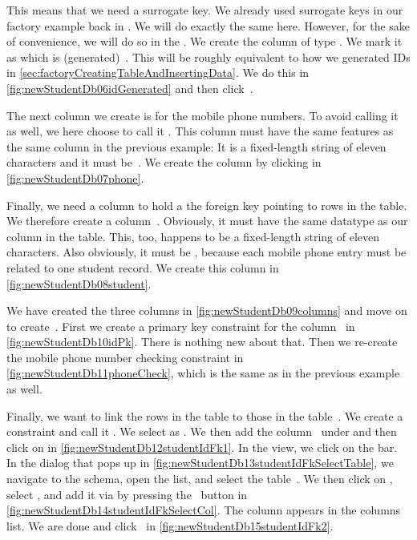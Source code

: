 This means that we need a surrogate key.
We already used surrogate keys in our factory example back in .
We will do exactly the same here.
However, for the sake of convenience, we will do so in the \pgmodeler.
We create the column  of type .
We mark it as  which is (generated)~.
This will be roughly equivalent to how we generated IDs in \cref{sec:factoryCreatingTableAndInsertingData}.
We do this in \cref{fig:newStudentDb06idGenerated} and then click~.

The next column we create is for the mobile phone numbers.
To avoid calling it  as well, we here choose to call it .
This column must have the same features as the same column in the previous example:
It is a fixed-length string of eleven characters and it must be~.
We create the column by clicking  in \cref{fig:newStudentDb07phone}.

Finally, we need a column to hold a the foreign key  pointing to rows in the  table.
We therefore create a column~.
Obviously, it must have the same datatype as our  column in the  table.
This, too, happens to be a fixed-length string of eleven characters.
Also obviously, it must be , because each mobile phone entry must be related to one student record.
We create this column in \cref{fig:newStudentDb08student}.

We have created the three columns in \cref{fig:newStudentDb09columns} and move on to create~.
First we create a primary key constraint for the column~ in \cref{fig:newStudentDb10idPk}.
There is nothing new about that.
Then we re-create the mobile phone number checking constraint in \cref{fig:newStudentDb11phoneCheck}, which is the same as in the previous example as well.

Finally, we want to link the rows in the table  to those in the table~.
We create a  constraint and call it .
We select  as .
We then add the column~ under  and then click on  in \cref{fig:newStudentDb12studentIdFk1}.
In the  view, we click on the  bar.
In the dialog that pops up in \cref{fig:newStudentDb13studentIdFkSelectTable}, we navigate to the  schema, open the  list, and select the table~.
We then click on , select , and add it via by pressing the
~\pgmodelerAddItem button in \cref{fig:newStudentDb14studentIdFkSelectCol}.
The  column appears in the columns list.
We are done and click~ in \cref{fig:newStudentDb15studentIdFk2}.

